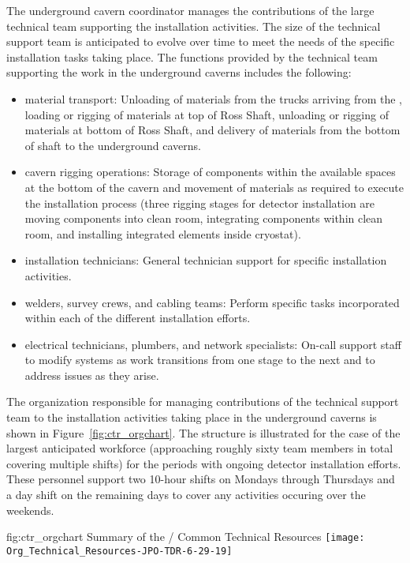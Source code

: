 The underground cavern coordinator manages the contributions of 
the large technical team supporting the installation activities.
The size of the technical support team is anticipated to evolve  
over time to meet the needs of the specific installation tasks 
taking place.  The functions provided by the technical team 
supporting the work in the underground caverns includes the
following:
\begin{itemize}
  \item {material transport:} Unloading of materials from the 
        trucks arriving from the , loading or rigging 
        of materials at top of Ross Shaft, unloading or rigging 
        of materials at bottom of Ross Shaft, and delivery of 
        materials from the bottom of shaft to the underground 
        caverns.        
  \item {cavern rigging operations:}  Storage of 
        components within the available spaces at the bottom 
        of the cavern and movement of materials as required to 
        execute the installation process (three rigging stages
        for detector installation are moving components into 
        clean room, integrating components within clean room, 
        and installing integrated elements inside cryostat).
  \item {installation technicians:}  General technician 
        support for specific installation activities. 
  \item {welders, survey crews, and cabling teams:}  Perform 
        specific tasks incorporated within each of the different 
        installation efforts.
  \item {electrical technicians, plumbers, and network 
        specialists:}  On-call support staff to modify systems 
        as work transitions from one stage to the next and to 
        address issues as they arise.             
\end{itemize}   
    
The organization responsible for managing contributions of 
the technical support team to the  installation 
activities taking place in the underground caverns is shown 
in Figure~\ref{fig:ctr_orgchart}.  The structure is illustrated
for the case of the largest anticipated workforce (approaching 
roughly sixty team members in total covering multiple shifts) 
for the periods with ongoing detector installation efforts.
These personnel support two 10-hour shifts on Mondays through 
Thursdays and a day shift on the remaining days to cover 
any activities occuring over the weekends. 
\begin{dunefigure}{fig:ctr_orgchart}
  {Summary of the / Common Technical Resources}
  \texttt{[image: Org\_Technical\_Resources-JPO-TDR-6-29-19]}
\end{dunefigure}

